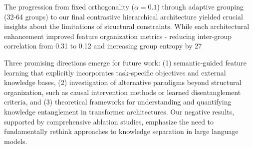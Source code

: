 \documentclass{article} %
\begin{document}
The progression from fixed orthogonality ($\alpha=0.1$) through adaptive grouping (32-64 groups) to our final contrastive hierarchical architecture yielded crucial insights about the limitations of structural constraints. While each architectural enhancement improved feature organization metrics - reducing inter-group correlation from 0.31 to 0.12 and increasing group entropy by 27%

Three promising directions emerge for future work: (1) semantic-guided feature learning that explicitly incorporates task-specific objectives and external knowledge bases, (2) investigation of alternative paradigms beyond structural organization, such as causal intervention methods or learned disentanglement criteria, and (3) theoretical frameworks for understanding and quantifying knowledge entanglement in transformer architectures. Our negative results, supported by comprehensive ablation studies, emphasize the need to fundamentally rethink approaches to knowledge separation in large language models.



\end{document}
